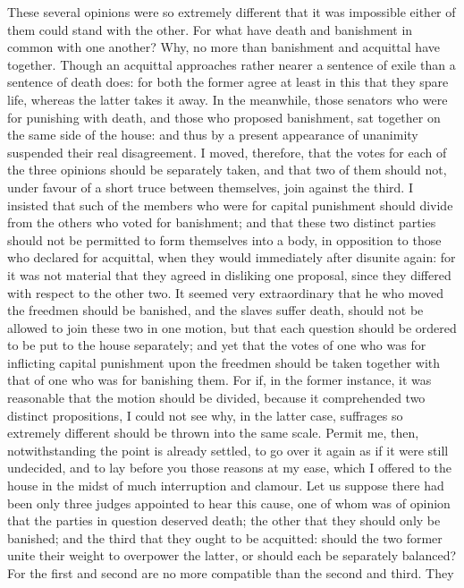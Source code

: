 These several opinions were so extremely different that it was impossible
either of them could stand with the other. For what have death and
banishment in common with one another? Why, no more than banishment and
acquittal have together. Though an acquittal approaches rather nearer a
sentence of exile than a sentence of death does: for both the former agree
at least in this that they spare life, whereas the latter takes it away.
In the meanwhile, those senators who were for punishing with death, and
those who proposed banishment, sat together on the same side of the
house: and thus by a present appearance of unanimity suspended their real
disagreement. I moved, therefore, that the votes for each of the three
opinions should be separately taken, and that two of them should not,
under favour of a short truce between themselves, join against the third.
I insisted that such of the members who were for capital punishment should
divide from the others who voted for banishment; and that these two
distinct parties should not be permitted to form themselves into a body,
in opposition to those who declared for acquittal, when they would
immediately after disunite again: for it was not material that they agreed
in disliking one proposal, since they differed with respect to the other
two. It seemed very extraordinary that he who moved the freedmen should be
banished, and the slaves suffer death, should not be allowed to join these
two in one motion, but that each question should be ordered to be put to
the house separately; and yet that the votes of one who was for inflicting
capital punishment upon the freedmen should be taken together with that of
one who was for banishing them. For if, in the former instance, it was
reasonable that the motion should be divided, because it comprehended two
distinct propositions, I could not see why, in the latter case, suffrages
so extremely different should be thrown into the same scale. Permit me,
then, notwithstanding the point is already settled, to go over it again as
if it were still undecided, and to lay before you those reasons at my
ease, which I offered to the house in the midst of much interruption and
clamour. Let us suppose there had been only three judges appointed to hear
this cause, one of whom was of opinion that the parties in question
deserved death; the other that they should only be banished; and the third
that they ought to be acquitted: should the two former unite their weight
to overpower the latter, or should each be separately balanced? For the
first and second are no more compatible than the second and third. They
